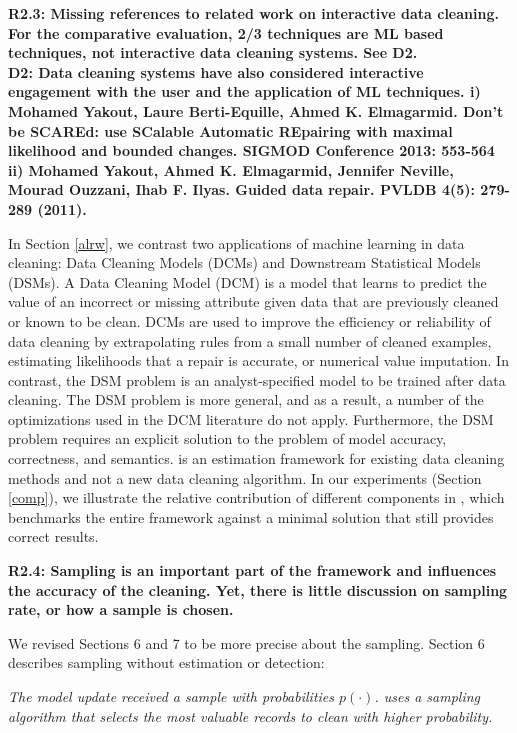 \vspace{0.5em}

\noindent\textbf{R2.3: Missing references to related work on interactive data cleaning. For the comparative evaluation, 2/3 techniques are ML based techniques, not interactive data cleaning systems. See D2.\\
D2: Data cleaning systems have also considered interactive engagement with the user and the application of ML techniques. 
i) Mohamed Yakout, Laure Berti-Equille, Ahmed K. Elmagarmid. Don't be SCAREd: use SCalable Automatic REpairing with maximal likelihood and bounded changes. SIGMOD Conference 2013: 553-564
ii) Mohamed Yakout, Ahmed K. Elmagarmid, Jennifer Neville, Mourad Ouzzani, Ihab F. Ilyas.
Guided data repair. PVLDB 4(5): 279-289 (2011).
}

In Section \ref{alrw}, we contrast two applications of machine learning in data cleaning: Data Cleaning Models (DCMs) and Downstream Statistical Models (DSMs).
A Data Cleaning Model (DCM) is a model that learns to predict the value of an incorrect or missing attribute given data that are previously cleaned or known to be clean.
DCMs are used to improve the efficiency or reliability of data cleaning by extrapolating rules from a small number of cleaned examples, estimating likelihoods that a repair is accurate, or numerical value imputation.
In contrast, the DSM problem is an analyst-specified model to be trained after data cleaning.
The DSM problem is more general, and as a result, a number of the optimizations used in the DCM literature do not apply.
Furthermore, the DSM problem requires an explicit solution to the problem of model accuracy, correctness, and semantics. 
\sys is an estimation framework for existing data cleaning methods and not a new data cleaning algorithm.
In our experiments (Section \ref{comp}), we illustrate the relative contribution of different components in \sys, which benchmarks the entire framework against a minimal solution that still provides correct results.


\vspace{0.5em}

\textbf{R2.4: Sampling is an important part of the framework and influences the accuracy of the cleaning. Yet, there is little discussion on sampling rate, or how a sample is chosen.}

We revised Sections 6 and 7 to be more precise about the sampling.
Section 6 describes sampling without estimation or detection:

\emph{The model update received a sample with probabilities $p(\cdot)$.
\sys uses a sampling algorithm that selects the most valuable records to clean with higher probability. }

